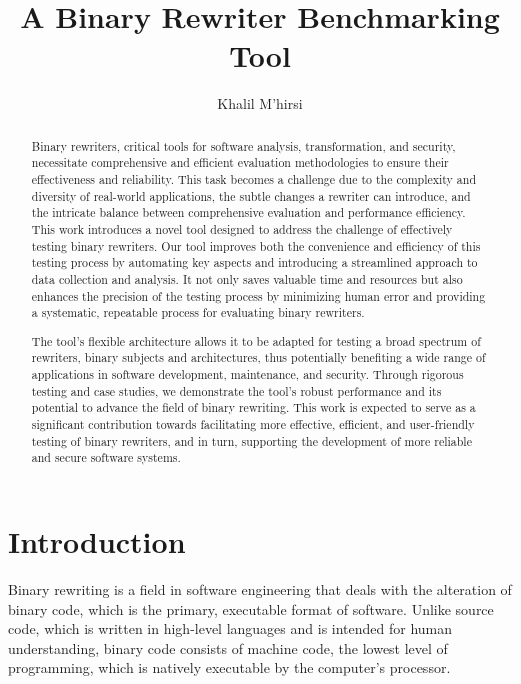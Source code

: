 \documentclass[a4paper,11pt,oneside]{report}
\title{A Binary Rewriter Benchmarking Tool}
\author{Khalil M'hirsi}
\begin{document}
\maketitle

\begin{abstract}
    \setlength{\parindent}{4em}
    Binary rewriters, critical tools for software analysis, transformation, and security,
    necessitate comprehensive and efficient evaluation methodologies to ensure their
    effectiveness and reliability. This task becomes a challenge due to the complexity and
    diversity of real-world applications, the subtle changes a rewriter can introduce, and the
    intricate balance between comprehensive evaluation and performance efficiency. This work
    introduces a novel tool designed to address the challenge of effectively testing binary
    rewriters. Our tool improves both the convenience and efficiency of this testing process by
    automating key aspects and introducing a streamlined approach to data collection and
    analysis. It not only saves valuable time and resources but also enhances the precision of the
    testing process by minimizing human error and providing a systematic, repeatable process
    for evaluating binary rewriters.

    The tool's flexible architecture allows it to be adapted for testing a broad spectrum of
    rewriters, binary subjects and architectures, thus potentially benefiting a wide range of
    applications in software development, maintenance, and security. Through rigorous testing
    and case studies, we demonstrate the tool's robust performance and its potential to
    advance the field of binary rewriting. This work is expected to serve as a significant
    contribution towards facilitating more effective, efficient, and user-friendly testing of binary
    rewriters, and in turn, supporting the development of more reliable and secure software
    systems.
\end{abstract}

\maketoc

\chapter{Introduction}

\setlength{\parindent}{4em}
Binary rewriting is a field in software engineering that deals with the alteration of
binary code, which is the primary, executable format of software. Unlike source code, which
is written in high-level languages and is intended for human understanding, binary code
consists of machine code, the lowest level of programming, which is natively executable by
the computer's processor.
\end{document}
